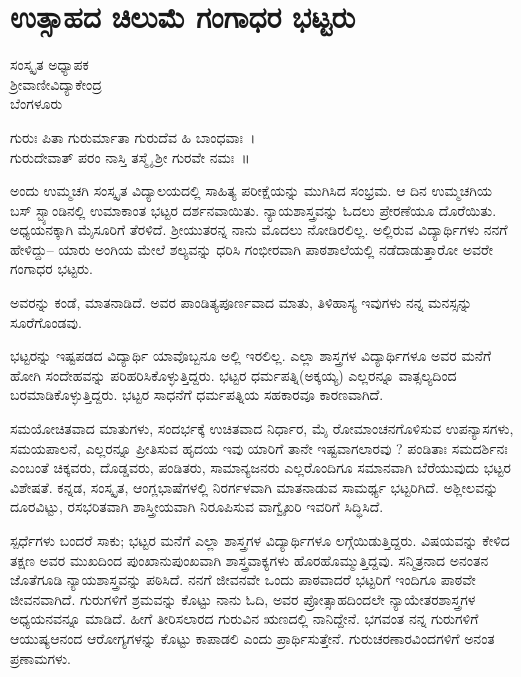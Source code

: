 {\fontsize{14}{16}\selectfont
\chapter{ಉತ್ಸಾಹದ ಚಿಲುಮೆ ಗಂಗಾಧರ ಭಟ್ಟರು}

\begin{center}
\smallskip
ಸಂಸ್ಕೃತ ಅಧ್ಯಾಪಕ\\
ಶ್ರೀವಾಣೀವಿದ್ಯಾಕೇಂದ್ರ\\
ಬೆಂಗಳೂರು
\addrule
\end{center}
\begin{center}
ಗುರುಃ ಪಿತಾ ಗುರುರ್ಮಾತಾ ಗುರುದೆವ ಹಿ ಬಾಂಧವಾಃ~।\\
ಗುರುದೇವಾತ್ ಪರಂ ನಾಸ್ತಿ ತಸ್ಮೈ ಶ್ರೀ ಗುರವೇ ನಮಃ~॥
\end{center}
ಅಂದು ಉಮ್ಮಚಗಿ ಸಂಸ್ಕೃತ ವಿದ್ಯಾಲಯದಲ್ಲಿ ಸಾಹಿತ್ಯ ಪರೀಕ್ಷೆಯನ್ನು ಮುಗಿಸಿದ ಸಂಭ್ರಮ. ಆ ದಿನ ಉಮ್ಮಚಗಿಯ ಬಸ್ ಸ್ಟ್ಯಾಂಡಿನಲ್ಲಿ ಉಮಾಕಾಂತ ಭಟ್ಟರ ದರ್ಶನವಾಯಿತು. ನ್ಯಾಯಶಾಸ್ತ್ರವನ್ನು ಓದಲು ಪ್ರೇರಣೆಯೂ ದೊರೆಯಿತು. ಅಧ್ಯಯನಕ್ಕಾಗಿ ಮೈಸೂರಿಗೆ ತೆರಳಿದೆ. ಶ್ರೀಯುತರನ್ನ ನಾನು ಮೊದಲು ನೋಡಿರಲಿಲ್ಲ. ಅಲ್ಲಿರುವ ವಿದ್ಯಾರ್ಥಿಗಳು ನನಗೆ ಹೇಳಿದ್ದು– ಯಾರು ಅಂಗಿಯ ಮೇಲೆ ಶಲ್ಯವನ್ನು ಧರಿಸಿ ಗಂಭೀರವಾಗಿ ಪಾಠಶಾಲೆಯಲ್ಲಿ ನಡೆದಾಡುತ್ತಾರೋ ಅವರೇ ಗಂಗಾಧರ ಭಟ್ಟರು.

ಅವರನ್ನು ಕಂಡೆ, ಮಾತನಾಡಿದೆ. ಅವರ ಪಾಂಡಿತ್ಯಪೂರ್ಣವಾದ ಮಾತು, ತಿಳಿಹಾಸ್ಯ ಇವುಗಳು ನನ್ನ ಮನಸ್ಸನ್ನು ಸೂರೆಗೊಂಡವು.

ಭಟ್ಟರನ್ನು ಇಷ್ಟಪಡದ ವಿದ್ಯಾರ್ಥಿ ಯಾವೊಬ್ಬನೂ ಅಲ್ಲಿ ಇರಲಿಲ್ಲ. ಎಲ್ಲಾ ಶಾಸ್ತ್ರಗಳ ವಿದ್ಯಾರ್ಥಿಗಳೂ ಅವರ ಮನೆಗೆ ಹೋಗಿ ಸಂದೇಹವನ್ನು ಪರಿಹರಿಸಿಕೊಳ್ಳುತ್ತಿದ್ದರು. ಭಟ್ಟರ ಧರ್ಮಪತ್ನಿ(ಅಕ್ಕಯ್ಯ) ಎಲ್ಲರನ್ನೂ ವಾತ್ಸಲ್ಯದಿಂದ ಬರಮಾಡಿಕೊಳ್ಳುತ್ತಿದ್ದರು. ಭಟ್ಟರ ಸಾಧನೆಗೆ ಧರ್ಮಪತ್ನಿಯ ಸಹಕಾರವೂ ಕಾರಣವಾಗಿದೆ.

ಸಮಯೋಚಿತವಾದ ಮಾತುಗಳು, ಸಂದರ್ಭಕ್ಕೆ ಉಚಿತವಾದ ನಿರ್ಧಾರ, ಮೈ ರೋಮಾಂಚನಗೊಳಿಸುವ ಉಪನ್ಯಾಸಗಳು, ಸಮಯಪಾಲನೆ, ಎಲ್ಲರನ್ನೂ ಪ್ರೀತಿಸುವ ಹೃದಯ ಇವು ಯಾರಿಗೆ ತಾನೇ ಇಷ್ಟವಾಗಲಾರವು ? ಪಂಡಿತಾಃ ಸಮದರ್ಶಿನಃ ಎಂಬಂತೆ ಚಿಕ್ಕವರು, ದೊಡ್ಡವರು, ಪಂಡಿತರು, ಸಾಮಾನ್ಯಜನರು ಎಲ್ಲರೊಂದಿಗೂ ಸಮಾನವಾಗಿ ಬೆರೆಯುವುದು ಭಟ್ಟರ ವಿಶೇಷತೆ. ಕನ್ನಡ, ಸಂಸ್ಕೃತ, ಆಂಗ್ಲಭಾಷೆಗಳಲ್ಲಿ ನಿರರ್ಗಳವಾಗಿ ಮಾತನಾಡುವ ಸಾಮರ್ಥ್ಯ ಭಟ್ಟರಿಗಿದೆ. ಅಶ್ಲೀಲವನ್ನು ದೂರವಿಟ್ಟು, ರಸಭರಿತವಾಗಿ ಶಾಸ್ತ್ರೀಯವಾಗಿ ನಿರೂಪಿಸುವ ವಾಗ್ವೈಖರಿ ಇವರಿಗೆ ಸಿದ್ಧಿಸಿದೆ.

ಸ್ಪರ್ಧೆಗಳು ಬಂದರೆ ಸಾಕು; ಭಟ್ಟರ ಮನೆಗೆ ಎಲ್ಲಾ ಶಾಸ್ತ್ರಗಳ ವಿದ್ಯಾರ್ಥಿಗಳೂ ಲಗ್ಗೆಯಿಡುತ್ತಿದ್ದರು. ವಿಷಯವನ್ನು ಕೇಳಿದ ತಕ್ಷಣ ಅವರ ಮುಖದಿಂದ ಪುಂಖಾನುಪುಂಖವಾಗಿ ಶಾಸ್ತ್ರವಾಕ್ಯಗಳು ಹೊರಹೊಮ್ಮುತ್ತಿದ್ದವು. ಸನ್ಮಿತ್ರನಾದ ಅನಂತನ ಜೊತೆಗೂಡಿ ನ್ಯಾಯಶಾಸ್ತ್ರವನ್ನು ಪಠಿಸಿದೆ. ನನಗೆ ಜೀವನವೇ ಒಂದು ಪಾಠವಾದರೆ ಭಟ್ಟರಿಗೆ ಇಂದಿಗೂ ಪಾಠವೇ ಜೀವನವಾಗಿದೆ. ಗುರುಗಳಿಗೆ ಶ್ರಮವನ್ನು ಕೊಟ್ಟು ನಾನು ಓದಿ, ಅವರ ಪ್ರೋತ್ಸಾಹದಿಂದಲೇ ನ್ಯಾಯೇತರಶಾಸ್ತ್ರಗಳ ಅಧ್ಯಯನವನ್ನೂ ಮಾಡಿದೆ. ಹೀಗೆ ತೀರಿಸಲಾರದ ಗುರುವಿನ ಋಣದಲ್ಲಿ ನಾನಿದ್ದೇನೆ. ಭಗವಂತ ನನ್ನ ಗುರುಗಳಿಗೆ ಆಯುಷ್ಯಆನಂದ ಆರೋಗ್ಯಗಳನ್ನು ಕೊಟ್ಟು ಕಾಪಾಡಲಿ ಎಂದು ಪ್ರಾರ್ಥಿಸುತ್ತೇನೆ. ಗುರುಚರಣಾರವಿಂದಗಳಿಗೆ ಅನಂತ ಪ್ರಣಾಮಗಳು.

\articleend	
}
